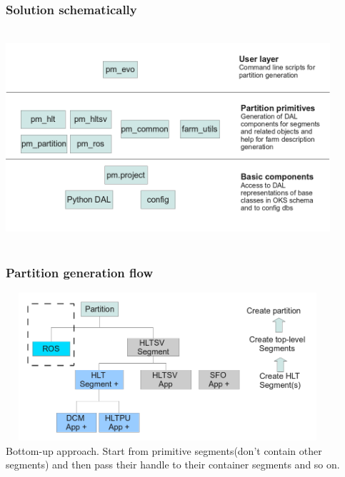 \documentclass{beamer}
\begin{document}
\begin{frame}
 \frametitle{Solution schematically}
 \includegraphics[height=8cm,width=12cm]{images/partition_maker_layers.png}
 
\end{frame}


\begin{frame}
\frametitle{Partition generation flow}
\includegraphics[height=5.5cm,width=12cm]{images/generation_flow.png} \\
Bottom-up approach. Start from primitive segments(don't contain other segments) and then pass their handle to their container segments and so on.
\end{frame}
\end{document}
